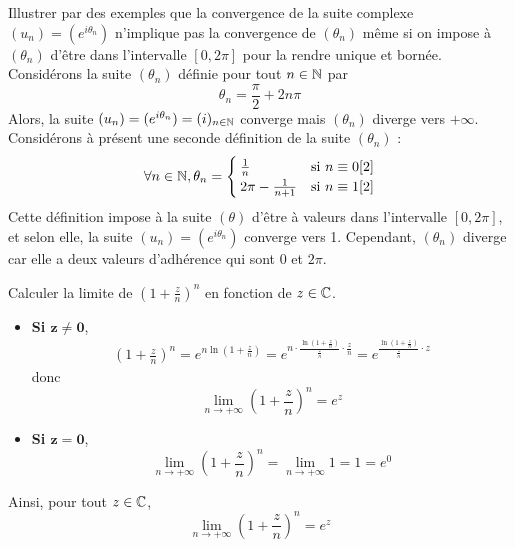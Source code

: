 \documentclass{article}
\begin{document}
\begin{question_kholle}{Illustrer par des exemples que la convergence
    de la suite complexe $(u_{n})=(e^{i \theta_{n}})$ n’implique pas la
    convergence de $(\theta_{n})$ même si on impose à $(\theta_{n})$
    d’être dans l’intervalle $[0,2 \pi]$ pour la rendre unique et bornée.}
  Considérons la suite $(\theta_{n})$ définie pour tout $n\in\mathbb N$ par
  \[
    \theta_{n}=\frac{\pi}{2}+2n \pi
  \]
  Alors, la suite $(u_{n})=(e^{i \theta_{n}}) = (i)_{n\in\mathbb N}$
  converge mais $(\theta_{n})$ diverge vers $+\infty$.\\
  Considérons à présent une seconde définition de la suite $(\theta_{n})$ :
  \[
    \forall n\in\mathbb N, \theta_{n}=
    \begin{cases}
      \frac{1}{n}           & \text{si } n\equiv 0[2] \\
      2 \pi - \frac{1}{n+1} & \text{si } n\equiv 1[2]
    \end{cases}
  \]
  Cette définition impose à la suite $(\theta)$ d’être à valeurs dans
  l’intervalle $[0,2 \pi]$, et selon elle, la suite $(u_{n})=(e^{i
        \theta_{n}})$ converge vers 1. Cependant, $(\theta_{n})$ diverge
  car elle a deux valeurs d’adhérence qui sont $0$ et $2 \pi$.

\end{question_kholle}

\begin{question_kholle}{Calculer la limite de $\displaystyle
      \left(1+\frac{z}{n}\right)^{n}$ en fonction de $z\in\mathbb C$.}
  \hfill\\
  \begin{itemize}
    \item \textbf{Si $\bm{z\neq 0}$},
          \begin{align*}
            \left(1+\frac{z}{n}\right)^{n} = e^{n\ln
                \left(1+\frac{z}{n}\right)} = e^{n\cdot \frac{\ln \left(1+
                  \frac{z}{n}\right)}{\frac{z}{n}}\cdot \frac{z}{n}} =
            e^{\frac{\ln \left(1+\frac{z}{n}\right)}{\frac{z}{n}}\cdot z}
          \end{align*}
          donc
          \[
            \lim_{n\to +\infty} \left(1+\frac{z}{n}\right)^{n} = e^{z}
          \]
    \item \textbf{Si $\bm{z=0}$},
          \[
            \lim_{n\to+\infty}\left(1+\frac{z}{n}\right)^{n} =
            \lim_{n\to+\infty}1=1=e^{0}
          \]
  \end{itemize}
  Ainsi, pour tout $z\in\mathbb C$,
  \[
    \lim_{n\to+\infty} \left(1+\frac{z}{n}\right)^{n}=e^{z}
  \]

\end{question_kholle}
\end{document}

